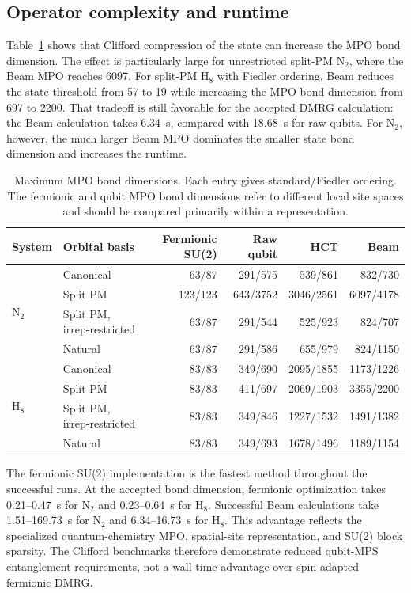 \documentclass[a4paper,onecolumn,10pt]{article}
\begin{document}
\subsection{Operator complexity and runtime}

Table~\ref{tab:mpo-dimensions} shows that Clifford compression of the state
can increase the MPO bond dimension.  The effect is particularly large for
unrestricted split-PM N$_2$, where the Beam MPO reaches 6097.  For split-PM
H$_8$ with Fiedler ordering, Beam reduces the state threshold from 57 to 19
while increasing the MPO bond dimension from 697 to 2200.  That tradeoff is
still favorable for the accepted DMRG calculation: the Beam calculation takes
6.34~s, compared with 18.68~s for raw qubits.  For N$_2$, however, the much
larger Beam MPO dominates the smaller state bond dimension and increases the
runtime.

\begin{table}[htbp]
\centering
\small
\caption{Maximum MPO bond dimensions.  Each entry gives standard/Fiedler
ordering.  The fermionic and qubit MPO bond dimensions refer to different
local site spaces and should be compared primarily within a representation.}
\label{tab:mpo-dimensions}
\begin{tabular}{llrrrr}
\toprule
System & Orbital basis & Fermionic SU(2) & Raw qubit & HCT & Beam \\
\midrule
\multirow{4}{*}{N$_2$}
 & Canonical                  & 63/87   & 291/575  & 539/861   & 832/730 \\
 & Split PM                   & 123/123 & 643/3752 & 3046/2561 & 6097/4178 \\
 & Split PM, irrep-restricted & 63/87   & 291/544  & 525/923   & 824/707 \\
 & Natural                    & 63/87   & 291/586  & 655/979   & 824/1150 \\
\midrule
\multirow{4}{*}{H$_8$}
 & Canonical                  & 83/83 & 349/690 & 2095/1855 & 1173/1226 \\
 & Split PM                   & 83/83 & 411/697 & 2069/1903 & 3355/2200 \\
 & Split PM, irrep-restricted & 83/83 & 349/846 & 1227/1532 & 1491/1382 \\
 & Natural                    & 83/83 & 349/693 & 1678/1496 & 1189/1154 \\
\bottomrule
\end{tabular}
\end{table}

The fermionic SU(2) implementation is the fastest method throughout the
successful runs.  At the accepted bond dimension, fermionic optimization
takes 0.21--0.47~s for N$_2$ and 0.23--0.64~s for H$_8$.  Successful Beam
calculations take 1.51--169.73~s for N$_2$ and 6.34--16.73~s for H$_8$.
This advantage reflects the specialized quantum-chemistry MPO, spatial-site
representation, and SU(2) block sparsity.  The Clifford benchmarks therefore
demonstrate reduced qubit-MPS entanglement requirements, not a wall-time
advantage over spin-adapted fermionic DMRG.
\end{document}
